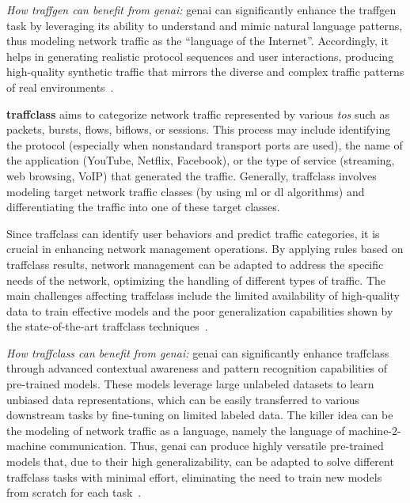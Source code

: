 \noindent
\emph{How \gls{traffgen} 
can benefit from \gls{genai}: }
\gls{genai} can significantly enhance the \gls{traffgen} task by leveraging its ability to understand and mimic natural language patterns, thus modeling network traffic as the ``language of the Internet''. Accordingly, it helps in generating realistic protocol sequences and user interactions, producing high-quality synthetic traffic that mirrors the diverse and complex traffic patterns of real environments~\cite{meng2023netgpt, jiang2024netdiffusion}.

\vspace{5pt}
\noindent
\textbf{\gls{traffclass}}
aims to categorize network traffic represented by various 
\emph{\glspl{to}}
such as packets, bursts, flows, biflows, or sessions. This process may include identifying the protocol (especially when nonstandard transport ports are used), the name of the application (\eg YouTube, Netflix, Facebook), or the type of service (\eg streaming, web browsing, VoIP) that generated the traffic.
Generally, \gls{traffclass} involves modeling target network traffic classes (\eg by using \gls{ml} or \gls{dl} algorithms) and differentiating the traffic into one of these target classes.

Since \gls{traffclass} can identify user behaviors and predict traffic categories, it is crucial in enhancing network management operations. By applying rules based on \gls{traffclass} results, network management can be adapted to address the specific needs of the network, optimizing the handling of different types of traffic. 
The main challenges affecting \gls{traffclass} include the limited availability of high-quality data to train effective models and the poor generalization capabilities shown by the state-of-the-art \gls{traffclass} techniques~\cite{pacheco2018towards, azab2022network,aceto2023aipowered}.


\noindent
\emph{How \gls{traffclass} 
can benefit from \gls{genai}: }
\gls{genai} can significantly enhance \gls{traffclass} through advanced contextual awareness and pattern recognition capabilities of pre-trained models.
These models leverage large unlabeled datasets to learn unbiased data representations, which can be easily transferred to various downstream tasks by fine-tuning on limited labeled data.
The killer idea can be the modeling of network traffic as a language, namely the language of machine-$2$-machine communication.
Thus, \gls{genai} can produce highly versatile pre-trained models that, due to their high generalizability, can be adapted to solve different \gls{traffclass} tasks with minimal effort, eliminating the need to train new models from scratch for each task~\cite{lin2022,wang2024netmamba}. 


